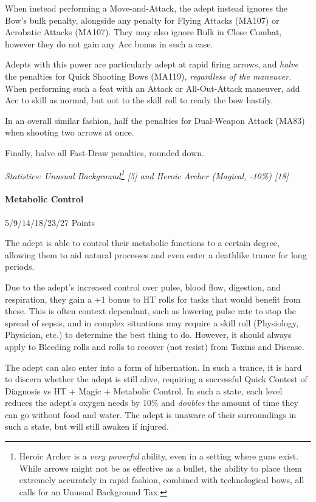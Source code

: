 \begin{multicols*}{3}
		When instead performing a Move-and-Attack, the adept instead ignores the Bow's bulk penalty, alongside any penalty for Flying Attacks (MA107) or Acrobatic Attacks (MA107). They may also ignore Bulk in Close Combat, however they do not gain any Acc bonus in such a case.
		
		Adepts with this power are particularly adept at rapid firing arrows, and \textit{halve} the penalties for Quick Shooting Bows (MA119), \textit{regardless of the maneuver}. When performing such a feat with an Attack or All-Out-Attack maneuver, add Acc to skill as normal, but not to the skill roll to ready the bow hastily. 
		
		In an overall similar fashion, half the penalties for Dual-Weapon Attack (MA83) when shooting two arrows at once.
		
		Finally, halve all Fast-Draw penalties, rounded down.

		\textcolor{OliveGreen}{\textit{Statistics: Unusual Background\footnote{Heroic Archer is a \textit{very powerful} ability, even in a setting where guns exist. While arrows might not be as effective as a bullet, the ability to place them extremely accurately in rapid fashion, combined with technological bows, all calls for an Unusual Background Tax.} [5] and Heroic Archer (Magical, -10\%) [18] }}
	
	\paragraph{Metabolic Control}
	\begin{flushright}
		5/9/14/18/23/27 Points
	\end{flushright}

		The adept is able to control their metabolic functions to a certain degree, allowing them to aid natural processes and even enter a deathlike trance for long periods.
		
		Due to the adept's increased control over pulse, blood flow, digestion, and respiration, they gain a +1 bonus to HT rolls for tasks that would benefit from these. This is often context dependant, such as lowering pulse rate to stop the spread of sepsis, and in complex situations may require a skill roll (Physiology, Physician, etc.) to determine the best thing to do. However, it should always apply to Bleeding rolls and rolls to recover (not resist) from Toxins and Disease.
		
		The adept can also enter into a form of hibernation. In such a trance, it is hard to discern whether the adept is still alive, requiring a successful Quick Contest of Diagnosis vs HT + Magic + Metabolic Control. In such a state, each level reduces the adept's oxygen needs by 10\% and \textit{doubles} the amount of time they can go without food and water.	The adept is unaware of their surroundings in such a state, but will still awaken if injured. 


\end{multicols*}
